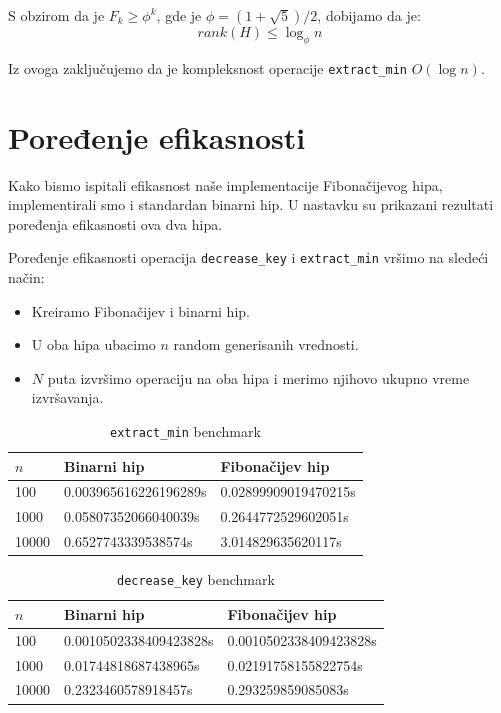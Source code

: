 \documentclass[a4paper]{article}
\theoremstyle{plain}
\theoremstyle{definition}
\begin{document}
S obzirom da je $F_{k} \geq \phi^{k}$, gde je $\phi = (1 + \sqrt{5}) / 2$, dobijamo da je:
$$rank(H) \leq \log_{\phi}{n} $$

Iz ovoga zaklju\v{c}ujemo da je kompleksnost operacije \texttt{extract\_min} $O(\log{n})$.

\section{Poređenje efikasnosti}
\label{sec:Exp}
Kako bismo ispitali efikasnost na\v{s}e implementacije Fibona\v{c}ijevog hipa, implementirali smo i standardan binarni hip. U nastavku su prikazani rezultati poređenja efikasnosti ova dva hipa.

Poređenje efikasnosti operacija \texttt{decrease\_key} i \texttt{extract\_min} vr\v{s}imo na slede\'{c}i na\v{c}in:
\begin{itemize}
    \item Kreiramo Fibona\v{c}ijev i binarni hip.
    \item U oba hipa ubacimo $n$ random generisanih vrednosti.
    \item $N$ puta izvr\v{s}imo operaciju na oba hipa i merimo njihovo ukupno vreme izvr\v{s}avanja.
\end{itemize}

\begin{table}[H]
    \centering
    \begin{tabular}{|l|l|l|}
        \hline
        $n$    & Binarni hip           & Fibona\v{c}ijev hip  \\
        \hline
        100    & 0.003965616226196289s & 0.02899909019470215s \\
        1000   & 0.05807352066040039s  & 0.2644772529602051s  \\
        10000  & 0.6527743339538574s   & 3.014829635620117s   \\
        \hline
    \end{tabular}
\label{tbl:fig1}
\caption{\texttt{extract\_min} benchmark}
\end{table}

\begin{table}[H]
    \centering
    \begin{tabular}{|l|l|l|}
        \hline
        $n$    & Binarni hip            & Fibona\v{c}ijev hip    \\
        \hline
        100    & 0.0010502338409423828s & 0.0010502338409423828s \\
        1000   & 0.01744818687438965s   & 0.02191758155822754s   \\
        10000  & 0.2323460578918457s    & 0.293259859085083s     \\
        \hline
    \end{tabular}
\label{tbl:fig1}
\caption{\texttt{decrease\_key} benchmark}
\end{table}
\end{document}

